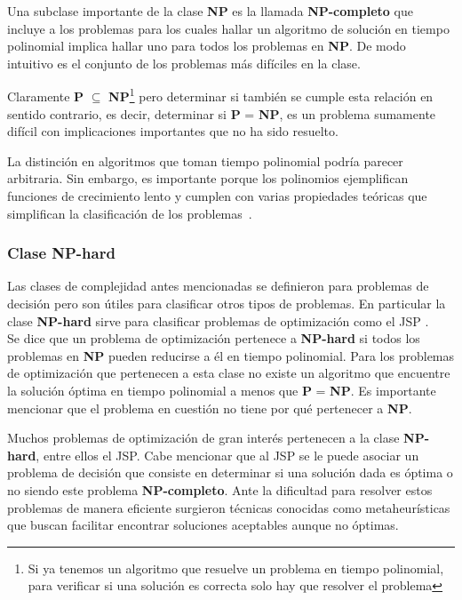 Una subclase importante de la clase \textbf{NP} es la llamada \textbf{NP-completo} que incluye a los problemas para los cuales hallar un algoritmo de solución 
en tiempo polinomial implica hallar uno para todos los problemas en \textbf{NP}. 
%
De modo intuitivo es el conjunto de los problemas más difíciles en la clase.

Claramente \textbf{P} $\subseteq$ \textbf{NP}\footnote{Si ya tenemos un algoritmo que resuelve un problema en tiempo polinomial, para verificar si una solución es correcta 
solo hay que resolver el problema} pero determinar si también se cumple esta relación en sentido contrario, es decir, determinar si \textbf{P} = \textbf{NP}, es un problema 
sumamente difícil con implicaciones importantes que no ha sido resuelto.

La distinción en algoritmos que toman tiempo polinomial podría parecer arbitraria.
%
Sin embargo, es importante porque los polinomios ejemplifican funciones de crecimiento lento y cumplen con varias propiedades teóricas que simplifican la clasificación 
de los problemas~\cite{wigderson2006p}.



\subsubsection*{Clase NP-hard}
Las clases de complejidad antes mencionadas se definieron para problemas de decisión pero son útiles para clasificar otros tipos de problemas. En particular la clase \textbf{NP-hard} sirve para clasificar problemas de optimización como el JSP . \\
Se dice que un problema de optimización pertenece a \textbf{NP-hard} si todos los problemas en \textbf{NP} pueden reducirse a él en tiempo polinomial. Para los problemas de optimización que pertenecen a esta clase no existe un algoritmo que encuentre la solución óptima en tiempo polinomial a menos que \textbf{P} = \textbf{NP}.  Es importante mencionar que el problema en cuestión no tiene por qué pertenecer a \textbf{NP}.

Muchos problemas de optimización de gran interés pertenecen a la clase \textbf{NP-hard}, entre ellos el JSP. Cabe mencionar que al JSP se le puede asociar un problema de decisión que consiste en determinar si una solución dada es óptima o no siendo este problema \textbf{NP-completo}. 
%
Ante la dificultad para resolver estos problemas de manera eficiente surgieron técnicas conocidas como metaheurísticas que buscan facilitar encontrar soluciones aceptables aunque no óptimas.


